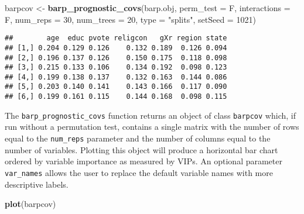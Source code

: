\documentclass[]{article}
\newenvironment{Shaded}{\begin{snugshade}}{\end{snugshade}}
\newcommand{\KeywordTok}[1]{\textcolor[rgb]{0.13,0.29,0.53}{\textbf{#1}}}
\newcommand{\DataTypeTok}[1]{\textcolor[rgb]{0.13,0.29,0.53}{#1}}
\newcommand{\DecValTok}[1]{\textcolor[rgb]{0.00,0.00,0.81}{#1}}
\newcommand{\StringTok}[1]{\textcolor[rgb]{0.31,0.60,0.02}{#1}}
\newcommand{\OperatorTok}[1]{\textcolor[rgb]{0.81,0.36,0.00}{\textbf{#1}}}
\newcommand{\NormalTok}[1]{#1}
\begin{document}
\begin{Shaded}
\begin{Highlighting}[]
\NormalTok{barpcov <-}\StringTok{ }\KeywordTok{barp_prognostic_covs}\NormalTok{(barp.obj,}
                                \DataTypeTok{perm_test =}\NormalTok{ F,}
                                \DataTypeTok{interactions =}\NormalTok{ F,}
                                \DataTypeTok{num_reps =} \DecValTok{30}\NormalTok{,}
                                \DataTypeTok{num_trees =} \DecValTok{20}\NormalTok{,}
                                \DataTypeTok{type =} \StringTok{"splits"}\NormalTok{,}
                                \DataTypeTok{setSeed =} \DecValTok{1021}\NormalTok{)}
\end{Highlighting}
\end{Shaded}

\begin{Shaded}
\end{Shaded}

\begin{verbatim}
##        age  educ pvote religcon   gXr region state
## [1,] 0.204 0.129 0.126    0.132 0.189  0.126 0.094
## [2,] 0.196 0.137 0.126    0.150 0.175  0.118 0.098
## [3,] 0.215 0.133 0.106    0.134 0.192  0.098 0.123
## [4,] 0.199 0.138 0.137    0.132 0.163  0.144 0.086
## [5,] 0.203 0.140 0.141    0.143 0.166  0.117 0.090
## [6,] 0.199 0.161 0.115    0.144 0.168  0.098 0.115
\end{verbatim}

The \texttt{barp\_prognostic\_covs} function returns an object of class
\texttt{barpcov} which, if run without a permutation test, contains a
single matrix with the number of rows equal to the \texttt{num\_reps}
parameter and the number of columns equal to the number of variables.
Plotting this object will produce a horizontal bar chart ordered by
variable importance as measured by VIPs. An optional parameter
\texttt{var\_names} allows the user to replace the default variable
names with more descriptive labels.

\begin{Shaded}
\begin{Highlighting}[]
\KeywordTok{plot}\NormalTok{(barpcov)}
\end{Highlighting}
\end{Shaded}
\end{document}
